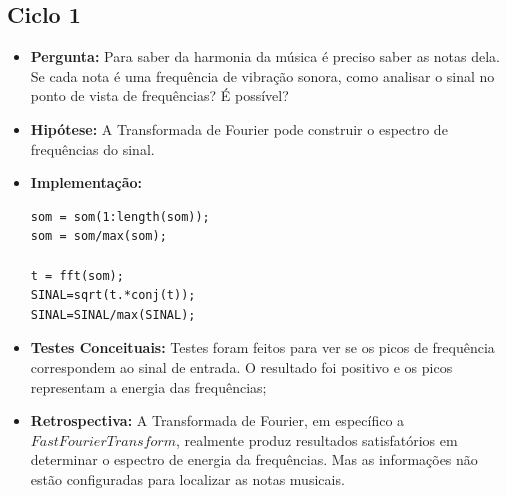 \subsection{Ciclo 1}
\begin{itemize}
\item \textbf{Pergunta:} Para saber da harmonia da música é preciso saber as notas dela. Se cada nota é uma frequência de vibração sonora, como analisar o sinal no ponto de vista de frequências? É possível?
\item \textbf{Hipótese:} A Transformada de Fourier pode construir o espectro de frequências do sinal.
\item \textbf{Implementação:} 
\begin{lstlisting}
som = som(1:length(som));
som = som/max(som);

t = fft(som);
SINAL=sqrt(t.*conj(t));
SINAL=SINAL/max(SINAL);
\end{lstlisting}
\item \textbf{Testes Conceituais:} Testes foram feitos para ver se os picos de frequência correspondem ao sinal de entrada. O resultado foi positivo e os picos representam a energia das frequências;
\item \textbf{Retrospectiva:} A Transformada de Fourier, em específico a $Fast Fourier Transform$, realmente produz resultados satisfatórios em determinar o espectro de energia da frequências. Mas as informações não estão configuradas para localizar as notas musicais.
\end{itemize}

